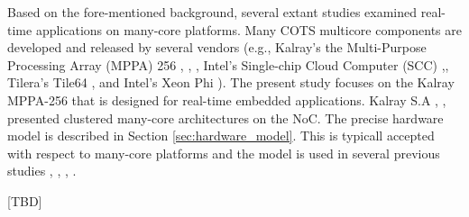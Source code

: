 \documentclass{sig-alternate-05-2015}
\begin{document}
Based on the fore-mentioned background, several extant studies examined real-time applications on many-core platforms.
Many COTS multicore components are developed and released by several vendors 
(e.g., Kalray's the Multi-Purpose Processing Array (MPPA) 256 \cite{de2013distributed}, \cite{de2013clustered}, \cite{de2014time},
Intel's Single-chip Cloud Computer (SCC) \cite{intel2015scc},\cite{baron2010single}, Tilera's Tile64 \cite{tilera2015tile64}, and
Intel's Xeon Phi \cite{chrysos2014intel} \cite{chrysos2012intel}).
The present study focuses on the Kalray MPPA-256 that is designed for real-time embedded applications.
Kalray S.A \cite{de2013distributed}, \cite{de2013clustered}, \cite{de2014time} presented clustered many-core architectures on the NoC.
The precise hardware model is described in Section \ref{sec:hardware_model}.
This is typicall accepted with respect to many-core platforms and the model is used in several previous studies \cite{perret2016temporal}, \cite{becker2016contention}, \cite{carle2014static}, \cite{perret2016mapping}.

[TBD]







\end{document}
